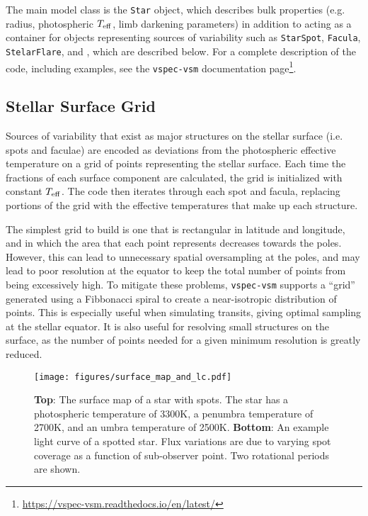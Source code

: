 \documentclass[twocolumn,linenumbers]{aastex631}
\newcommand{\teff}{$T_{\rm eff}$}
\newcommand{\urldocsvspecvsm}{\url{https://vspec-vsm.readthedocs.io/en/latest/}}
\begin{document}
The main model class is the \texttt{Star} object, which describes bulk properties (e.g. radius, photospheric \teff, limb darkening parameters) in addition to acting as 
a container for objects representing sources of variability such as \texttt{StarSpot}, \texttt{Facula}, \texttt{StelarFlare}, and , which are described below. For a complete description of the code, including examples, see the \texttt{vspec-vsm} documentation page\footnote{\urldocsvspecvsm}.

\subsection{Stellar Surface Grid}
Sources of variability that exist as major structures on the stellar surface (i.e. spots and faculae) are encoded as deviations from the photospheric effective temperature on a grid of points representing the stellar surface. Each time the fractions of each surface component are calculated, the grid is initialized with constant \teff. The code then iterates through each spot and facula, replacing portions of the grid with the effective temperatures that make up each structure.

The simplest grid to build is one that is rectangular in latitude and longitude, and in which the area that each point represents decreases towards the poles. However, this can lead to unnecessary spatial oversampling at the poles, and may lead to poor resolution at the equator to keep the total number of points from being excessively high. To mitigate these problems, \texttt{vspec-vsm} supports a ``grid'' generated using a Fibbonacci spiral to create a near-isotropic distribution of points. This is especially useful when simulating transits, giving optimal sampling at the stellar equator. It is also useful for resolving small structures on the surface, as the number of points needed for a given minimum resolution is greatly reduced.


\begin{figure}
    \centering
        \texttt{[image: figures/surface\_map\_and\_lc.pdf]}
    \caption{{\bf Top}: The surface map of a star with spots. The star has a photospheric temperature of 3300K, a penumbra temperature of 2700K, and an umbra temperature of 2500K.
    {\bf Bottom}: An example light curve of a spotted star. Flux variations are due to varying spot coverage as a function of sub-observer point. Two rotational periods are shown.
    }
    \label{fig:surface_map}
\end{figure}
\end{document}
